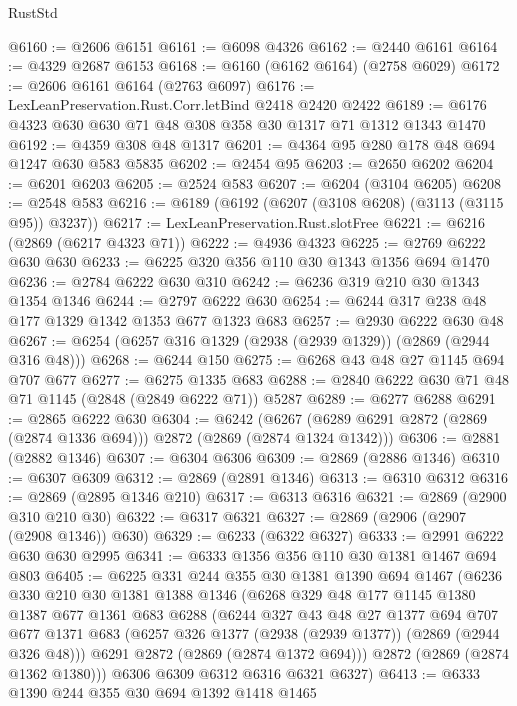 \begin{lexlean}{RustStd}
\begin{coremodule}
{\begin{coremodule}
{{{{{{{{{{{{@6160 := @2606 @6151
@6161 := @6098 @4326
@6162 := @2440 @6161
@6164 := @4329 @2687 @6153
@6168 := @6160 (@6162 @6164) (@2758 @6029)
@6172 := @2606 @6161 @6164 (@2763 @6097)
@6176 := LexLeanPreservation.Rust.Corr.letBind @2418 @2420 @2422
@6189 := @6176 @4323 @630 @630 @71 @48 @308 @358 @30 @1317 @71 @1312 @1343 @1470
@6192 := @4359 @308 @48 @1317
@6201 := @4364 @95 @280 @178 @48 @694 @1247 @630 @583 @5835
@6202 := @2454 @95
@6203 := @2650 @6202
@6204 := @6201 @6203
@6205 := @2524 @583
@6207 := @6204 (@3104 @6205)
@6208 := @2548 @583
@6216 := @6189 (@6192 (@6207 (@3108 @6208) (@3113 (@3115 @95)) @3237))
@6217 := LexLeanPreservation.Rust.slotFree
@6221 := @6216 (@2869 (@6217 @4323 @71))
@6222 := @4936 @4323
@6225 := @2769 @6222 @630 @630
@6233 := @6225 @320 @356 @110 @30 @1343 @1356 @694 @1470
@6236 := @2784 @6222 @630 @310
@6242 := @6236 @319 @210 @30 @1343 @1354 @1346
@6244 := @2797 @6222 @630
@6254 := @6244 @317 @238 @48 @177 @1329 @1342 @1353 @677 @1323 @683
@6257 := @2930 @6222 @630 @48
@6267 := @6254 (@6257 @316 @1329 (@2938 (@2939 @1329)) (@2869 (@2944 @316 @48)))
@6268 := @6244 @150
@6275 := @6268 @43 @48 @27 @1145 @694 @707 @677
@6277 := @6275 @1335 @683
@6288 := @2840 @6222 @630 @71 @48 @71 @1145 (@2848 (@2849 @6222 @71)) @5287
@6289 := @6277 @6288
@6291 := @2865 @6222 @630
@6304 := @6242
    (@6267 (@6289 @6291 @2872 (@2869 (@2874 @1336 @694))) @2872 (@2869 (@2874 @1324 @1342)))
@6306 := @2881 (@2882 @1346)
@6307 := @6304 @6306
@6309 := @2869 (@2886 @1346)
@6310 := @6307 @6309
@6312 := @2869 (@2891 @1346)
@6313 := @6310 @6312
@6316 := @2869 (@2895 @1346 @210)
@6317 := @6313 @6316
@6321 := @2869 (@2900 @310 @210 @30)
@6322 := @6317 @6321
@6327 := @2869 (@2906 (@2907 (@2908 @1346)) @630)
@6329 := @6233 (@6322 @6327)
@6333 := @2991 @6222 @630 @630 @2995
@6341 := @6333 @1356 @356 @110 @30 @1381 @1467 @694 @803
@6405 := @6225
    @331
    @244
    @355
    @30
    @1381
    @1390
    @694
    @1467
    (@6236
      @330
      @210
      @30
      @1381
      @1388
      @1346
      (@6268
        @329
        @48
        @177
        @1145
        @1380
        @1387
        @677
        @1361
        @683
        @6288
        (@6244
          @327
          @43
          @48
          @27
          @1377
          @694
          @707
          @677
          @1371
          @683
          (@6257 @326 @1377 (@2938 (@2939 @1377)) (@2869 (@2944 @326 @48)))
          @6291
          @2872
          (@2869 (@2874 @1372 @694)))
        @2872
        (@2869 (@2874 @1362 @1380)))
      @6306
      @6309
      @6312
      @6316
      @6321
      @6327)
@6413 := @6333 @1390 @244 @355 @30 @694 @1392 @1418 @1465
}}}}}}}}}}}}
\end{coremodule}}
\end{coremodule}
\end{lexlean}
